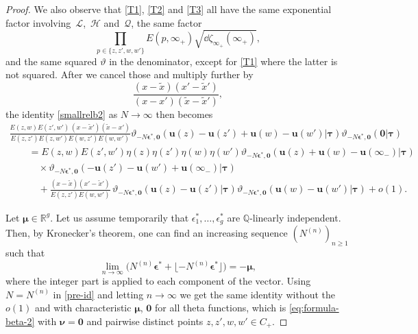 \documentclass[10pt,a4paper]{amsart}
\numberwithin{equation}{section}
\begin{document}
\begin{proof}
We also observe that \eqref{T1}, \eqref{T2} and \eqref{T3} all have the same exponential factor involving~$\mathcal{L}$,~$\mathcal{H}$ and~$\mathcal{Q}$, the same factor
\[
\prod_{p \in \{z,z',w,w'\}} E(p,\infty_+)\sqrt{\dd \zeta_{\infty_+}(\infty_+)},
\]
and the same squared $\vartheta$ in the denominator, except for \eqref{T1} where the latter is not squared. After we cancel those and multiply further by
\[
\frac{(x - \tilde{x})(x' - \tilde{x}')}{(x - x')(\tilde{x} - \tilde{x}')},
\]
the identity \eqref{smallrelb2} as $N \rightarrow \infty$ then becomes
\begin{gather}
 \frac{E(z,w)E(z',w')\,(x - \tilde{x}')(\tilde{x} - x')}{E(z,z')E(z,w')E(w,z')E(w,w')}\vartheta_{-N\bm{\epsilon}^*,\bm{0}} (\bm{u}(z) - \bm{u}(z') + \bm{u}(w) - \bm{u}(w') |\bm{\tau} )\vartheta_{-N\bm{\epsilon}^*,\bm{0}} (\bm{0} |\bm{\tau} ) \nonumber\\
 \qquad{}= E(z,w)E(z',w')\eta(z)\eta(z')\eta(w)\eta(w')\vartheta_{-N\bm{\epsilon}^*,\bm{0}} (\bm{u}(z) + \bm{u}(w) - \bm{u}(\infty_-) |\bm{\tau} )\nonumber\\
  \qquad\quad{}\times\vartheta_{-N\bm{\epsilon}^*,\bm{0}} (- \bm{u}(z') - \bm{u}(w') + \bm{u}(\infty_-) |\bm{\tau} ) \nonumber\\
 \qquad\quad{}+ \frac{(x - \tilde{x})(x' - \tilde{x}')}{E(z,z')E(w,w')}\,\vartheta_{-N\bm{\epsilon}^*,\bm{0}} (\bm{u}(z) - \bm{u}(z') |\bm{\tau} )\vartheta_{-N\bm{\epsilon}^*,\bm{0}} (\bm{u}(w) - \bm{u}(w') |\bm{\tau} ) + o(1).\label{pre-id}
\end{gather}

Let $\bm{\mu} \in \mathbb{R}^g$. Let us assume temporarily that
$\epsilon_{1}^*, \ldots, \epsilon_{g}^*$ are $\mathbb{Q}$-linearly independent. Then,
by Kronecker's theorem, one can find an increasing sequence $(N^{(n)})_{n \geq 1}$
such that
\begin{equation*}
 \lim_{n \rightarrow \infty}\bigl(N^{(n)} \bm{\epsilon}^* + \lfloor -N^{(n)}\bm{\epsilon}^* \rfloor\bigr) = - \bm{\mu},
\end{equation*}
where the integer part is applied to each component of the vector.
Using $N = N^{(n)}$ in \eqref{pre-id} and letting $n \rightarrow \infty$
we get the same identity without the $o(1)$ and with characteristic
$\bm{\mu}$, $\bm{0}$ for all theta functions, which is \eqref{eq:formula-beta-2} with $\bm{\nu} = \bm{0}$ and pairwise distinct points $z,z',w,w' \in C_+$.




\end{proof}
\end{document}
